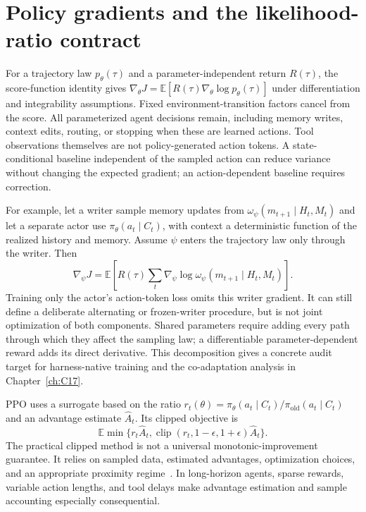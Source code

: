 \section{Policy gradients and the likelihood-ratio contract}
\label{sec:C08:policygradient}
For a trajectory law $p_\theta(\tau)$ and a parameter-independent return $R(\tau)$, the score-function identity gives $\nabla_\theta J=\mathbb E[R(\tau)\nabla_\theta\log p_\theta(\tau)]$ under differentiation and integrability assumptions. Fixed environment-transition factors cancel from the score. All parameterized agent decisions remain, including memory writes, context edits, routing, or stopping when these are learned actions. Tool observations themselves are not policy-generated action tokens. A state-conditional baseline independent of the sampled action can reduce variance without changing the expected gradient; an action-dependent baseline requires correction.

For example, let a writer sample memory updates from $\omega_\psi(m_{t+1}\mid H_t,M_t)$ and let a separate actor use $\pi_\theta(a_t\mid C_t)$, with context a deterministic function of the realized history and memory. Assume $\psi$ enters the trajectory law only through the writer. Then
\begin{equation}
 \nabla_\psi J=
 \mathbb E\!\left[R(\tau)
 \sum_t\nabla_\psi\log
 \omega_\psi(m_{t+1}\mid H_t,M_t)\right].
\end{equation}
Training only the actor's action-token loss omits this writer gradient. It can still define a deliberate alternating or frozen-writer procedure, but is not joint optimization of both components. Shared parameters require adding every path through which they affect the sampling law; a differentiable parameter-dependent reward adds its direct derivative. This decomposition gives a concrete audit target for harness-native training and the co-adaptation analysis in Chapter~\ref{ch:C17}.

PPO uses a surrogate based on the ratio $r_t(\theta)=\pi_\theta(a_t\mid C_t)/\pi_{\mathrm{old}}(a_t\mid C_t)$ and an advantage estimate $\widehat A_t$. Its clipped objective is
\begin{equation}
 \mathbb E\min\{r_t\widehat A_t,
 \operatorname{clip}(r_t,1-\epsilon,1+\epsilon)\widehat A_t\}.
\end{equation}
The practical clipped method is not a universal monotonic-improvement guarantee. It relies on sampled data, estimated advantages, optimization choices, and an appropriate proximity regime~\cite{schulman2017ppo}. In long-horizon agents, sparse rewards, variable action lengths, and tool delays make advantage estimation and sample accounting especially consequential.

